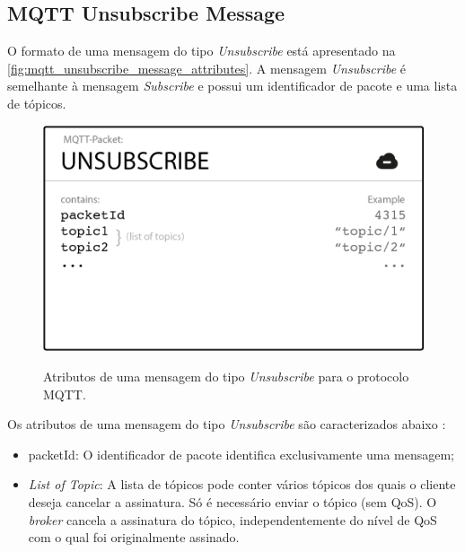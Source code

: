 \subsection{MQTT Unsubscribe Message}\label{subsection:mqtt_unsubscribe_message}

O formato de uma mensagem do tipo \textit{Unsubscribe} está apresentado na \autoref{fig:mqtt_unsubscribe_message_attributes}. A mensagem \textit{Unsubscribe} é semelhante à mensagem  \textit{Subscribe} e possui um identificador de pacote e uma lista de tópicos.

\begin{figure}[htbp]
    \centering
    \caption{Atributos de uma mensagem do tipo \textit{Unsubscribe} para o protocolo MQTT.}
    \includegraphics[scale=0.5]{Imagens/mqtt_unsubscribe_message_attributes.png}
    \label{fig:mqtt_unsubscribe_message_attributes}
\end{figure}

Os atributos de uma mensagem do tipo \textit{Unsubscribe} são caracterizados abaixo \cite{ref:026}:

\begin{itemize}
    \item packetId: O identificador de pacote identifica exclusivamente uma mensagem;
    \item \textit{List of Topic}: A lista de tópicos pode conter vários tópicos dos quais o cliente deseja cancelar a assinatura. Só é necessário enviar o tópico (sem QoS). O \textit{broker} cancela a assinatura do tópico, independentemente do nível de QoS com o qual foi originalmente assinado.
\end{itemize}

